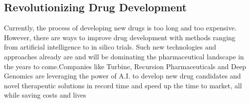 \documentclass[12pt]{article}
\begin{document}
\subsection*{Revolutionizing Drug Development}
Currently, the process of developing new drugs is too long and too expensive. However, there are ways to improve drug development with methods ranging from artificial intelligence to in silico trials. Such new technologies and approaches already are and will be dominating the pharmaceutical landscape in the years to come.Companies like Turbine, Recursion Pharmaceuticals and Deep Genomics are leveraging the power of A.I. to develop new drug candidates and novel therapeutic solutions in record time and speed up the time to market, all while saving costs and lives











	
\end{document}
